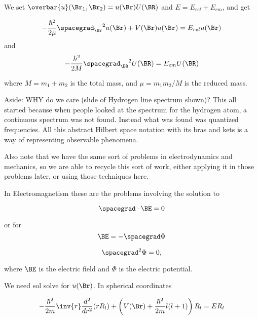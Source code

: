 We set $\overbar{u}(\Br_1, \Br_2) = u(\Br) U(\BR)$ and $E = E_{rel} + E_{cm}$, and get

\begin{equation}\label{eqn:PHY356FLecture10:10}
-\frac{\hbar^2}{2\mu} {\spacegrad_{\Br}}^2 u(\Br) + V(\Br) u(\Br) = E_{rel} u(\Br)
\end{equation}
and
\begin{equation}\label{eqn:PHY356FLecture10:20}
-\frac{\hbar^2}{2M} {\spacegrad_{\BR}}^2 U(\BR) = E_{cm} U(\BR)
\end{equation}

where $M = m_1 + m_2$ is the total mass, and $\mu = m_1 m_2/M$ is the reduced mass.

Aside: WHY do we care (slide of Hydrogen line spectrum shown)?  This all started because when people looked at the spectrum for the hydrogen atom, a continuous spectrum was not found.  Instead what was found was quantized frequencies.  All this abstract Hilbert space notation with its bras and kets is a way of representing observable phenomena.

Also note that we have the same sort of problems in electrodynamics and mechanics, so we are able to recycle this sort of work, either applying it in those problems later, or using those techniques here.

In Electromagnetism these are the problems involving the solution to

\begin{equation}\label{eqn:PHY356FLecture10:30}
\spacegrad \cdot \BE = 0
\end{equation}

or for
\begin{equation}\label{eqn:PHY356FLecture10:40}
\BE = - \spacegrad \Phi
\end{equation}


\begin{equation}\label{eqn:PHY356FLecture10:60}
\spacegrad^2 \Phi = 0,
\end{equation}

where $\BE$ is the electric field and $\Phi$ is the electric potential.


We need sol solve  for $u(\Br)$.  In spherical coordinates

\begin{equation}\label{eqn:PHY356FLecture10:70}
-\frac{\hbar^2}{2m} \inv{r} \frac{d^2}{dr^2} ( r R_l ) + \left( V(\Br) + \frac{\hbar^2 }{2m} l(l+1) \right) R_l = E R_l
\end{equation}

